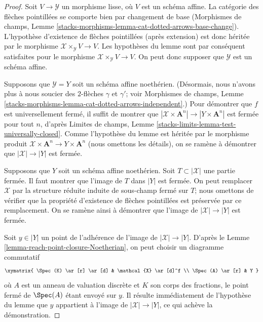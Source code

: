 \begin{proof}
Soit $V \to \mathcal{Y}$ un morphisme lisse, où $V$ est un schéma affine.
La catégorie des flèches pointillées se comporte bien par changement de base
(Morphismes de champs, Lemme
\ref{stacks-morphisms-lemma-cat-dotted-arrows-base-change}).
L'hypothèse d'existence de flèches pointillées (après extension)
est donc héritée par le morphisme $\mathcal{X} \times_\mathcal{Y} V \to V$.
Les hypothèses du lemme sont par conséquent satisfaites pour le morphisme
$\mathcal{X} \times_\mathcal{Y} V \to V$.
On peut donc supposer que $\mathcal{Y}$ est un schéma affine.

\medskip\noindent
Supposons que $\mathcal{Y} = Y$ soit un schéma affine noethérien.
(Désormais, nous n'avons plus à nous soucier des
$2$-flèches $\gamma$ et $\gamma'$; voir Morphismes de champs, Lemme
\ref{stacks-morphisms-lemma-cat-dotted-arrows-independent}.)
Pour démontrer que $f$ est universellement fermé, il suffit de montrer que
$|\mathcal{X} \times \mathbf{A}^n| \to |Y \times \mathbf{A}^n|$ est fermée
pour tout $n$, d'après Limites de champs, Lemme
\ref{stacks-limits-lemma-test-universally-closed}. Comme l'hypothèse
du lemme est héritée par le morphisme produit
$\mathcal{X} \times \mathbf{A}^n \to Y \times \mathbf{A}^n$ (nous omettons les détails),
on se ramène à démontrer que $|\mathcal{X}| \to |Y|$ est fermée.

\medskip\noindent
Supposons que $Y$ soit un schéma affine noethérien.
Soit $T \subset |\mathcal{X}|$ une partie fermée. Il faut montrer que
l'image de $T$ dans $|Y|$ est fermée. On peut remplacer $\mathcal{X}$
par la structure réduite induite de sous-champ fermé sur $T$; nous
omettons de vérifier que la propriété d'existence de
flèches pointillées est préservée par ce remplacement.
On se ramène ainsi à démontrer que l'image
de $|\mathcal{X}| \to |Y|$ est fermée.

\medskip\noindent
Soit $y \in |Y|$ un point de l'adhérence de l'image de
$|\mathcal{X}| \to |Y|$. D'après le Lemme \ref{lemma-reach-point-closure-Noetherian},
on peut choisir un diagramme commutatif
$$
\xymatrix{
\Spec(K) \ar[r] \ar[d] & \mathcal{X} \ar[d]^f \\
\Spec(A) \ar[r] & Y
}
$$
où $A$ est un anneau de valuation discrète et $K$ son corps des fractions,
le point fermé de $\Spec(A)$ étant envoyé sur $y$. Il résulte immédiatement
de l'hypothèse du lemme que $y$ appartient à l'image de
$|\mathcal{X}| \to |Y|$, ce qui achève la démonstration.
\end{proof}










